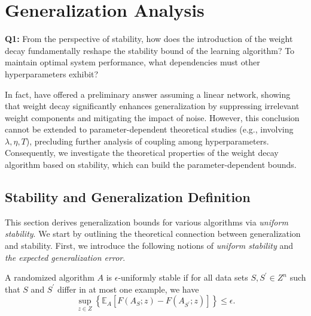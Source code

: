 \section{Generalization Analysis}

\begin{tcolorbox}
\textbf{Q1:} From the perspective of stability, how does the introduction of the weight decay fundamentally reshape the stability bound of the learning algorithm? To maintain optimal system performance, what dependencies must other hyperparameters exhibit? 
\end{tcolorbox}

In fact, \citet{10.5555/2986916.2987033} have offered a preliminary answer assuming a linear network, showing that weight decay significantly enhances generalization by suppressing irrelevant weight components and mitigating the impact of noise. However, this conclusion cannot be extended to parameter-dependent theoretical studies (e.g., involving $\lambda, \eta, T$), precluding further analysis of coupling among hyperparameters. Consequently, we investigate the theoretical properties of the weight decay algorithm based on stability, which can build the parameter-dependent bounds.


\subsection{Stability and Generalization Definition}
This section derives generalization bounds for various algorithms via \emph{uniform stability}. We start by outlining the theoretical connection between generalization and stability.
First, we introduce the following notions of \emph{uniform stability} and \emph{the expected generalization error}.
\begin{definition}
A randomized algorithm $A$ is $\epsilon$-uniformly stable if for all data sets $S, S^{\prime} \in Z^{n}$ such that $S$ and $S^{\prime}$ differ in at most one example, we have
    \begin{equation}\label{E-stab}
     \mathop{sup}\limits_{z\in Z}\left\{\mathbb{E}_{A}\left[F(A_S;z)-F(A_{S^{\prime}};z)\right] \right\} \leq \epsilon.
    \end{equation}
\end{definition}

